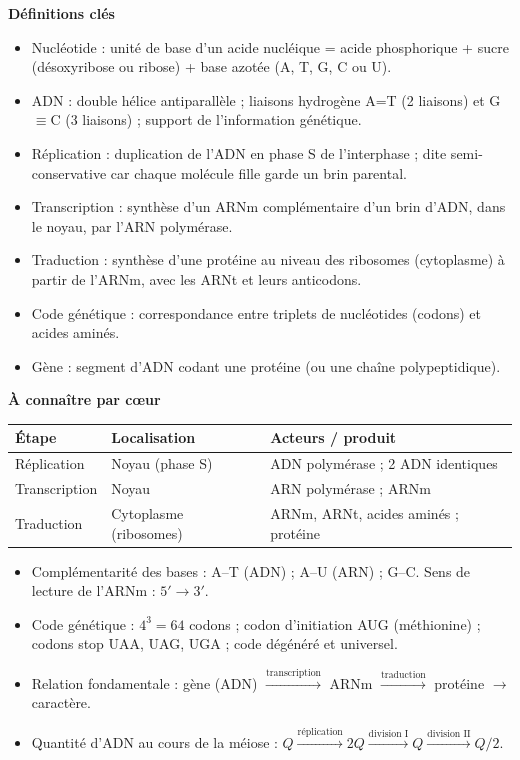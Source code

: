 \documentclass[11pt]{article}
\newcommand{\cle}[1]{{\popxbold\color{popdark}#1}}
\begin{document}
\begin{bilan}
\textbf{Définitions clés}
\begin{itemize}
  \item \cle{Nucléotide} : unité de base d'un acide nucléique = acide phosphorique + sucre (désoxyribose ou ribose) + base azotée (A, T, G, C ou U).
  \item \cle{ADN} : double hélice antiparallèle ; liaisons hydrogène A=T (2 liaisons) et G$\equiv$C (3 liaisons) ; support de l'information génétique.
  \item \cle{Réplication} : duplication de l'ADN en phase S de l'interphase ; dite \cle{semi-conservative} car chaque molécule fille garde un brin parental.
  \item \cle{Transcription} : synthèse d'un ARNm complémentaire d'un brin d'ADN, dans le noyau, par l'ARN polymérase.
  \item \cle{Traduction} : synthèse d'une protéine au niveau des ribosomes (cytoplasme) à partir de l'ARNm, avec les ARNt et leurs anticodons.
  \item \cle{Code génétique} : correspondance entre triplets de nucléotides (codons) et acides aminés.
  \item \cle{Gène} : segment d'ADN codant une protéine (ou une chaîne polypeptidique).
\end{itemize}

\textbf{À connaître par cœur}
\begin{center}
\begin{tabularx}{\linewidth}{|l|X|X|}\hline
\rowcolor{popblueL} \textbf{Étape} & \textbf{Localisation} & \textbf{Acteurs / produit} \\ \hline
Réplication & Noyau (phase S) & ADN polymérase ; 2 ADN identiques \\ \hline
Transcription & Noyau & ARN polymérase ; ARNm \\ \hline
Traduction & Cytoplasme (ribosomes) & ARNm, ARNt, acides aminés ; protéine \\ \hline
\end{tabularx}
\end{center}

\begin{itemize}
  \item Complémentarité des bases : A--T (ADN) ; A--U (ARN) ; G--C. Sens de lecture de l'ARNm : $5' \to 3'$.
  \item Code génétique : $4^3 = 64$ codons ; codon d'initiation AUG (méthionine) ; codons stop UAA, UAG, UGA ; code dégénéré et universel.
  \item Relation fondamentale : gène (ADN) $\xrightarrow{\text{transcription}}$ ARNm $\xrightarrow{\text{traduction}}$ protéine $\to$ caractère.
  \item Quantité d'ADN au cours de la méiose : $Q \xrightarrow{\text{réplication}} 2Q \xrightarrow{\text{division I}} Q \xrightarrow{\text{division II}} Q/2$.
\end{itemize}


\end{bilan}
\end{document}
